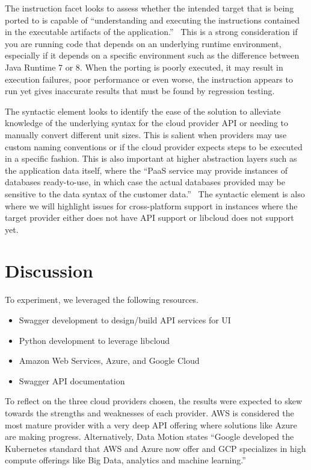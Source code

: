 The instruction facet looks to assess whether the intended target that is being ported to 
is capable of ``understanding and executing the instructions contained in the executable 
artifacts of the application.''~\cite{hid-sp18-518-Cloud-Council} This is a strong 
consideration if you are running code that depends on an underlying runtime environment, 
especially if it depends on a specific environment such as the difference between Java 
Runtime 7 or 8. When the porting is poorly executed, it may result in execution failures, 
poor performance or even worse, the instruction appears to run yet gives inaccurate 
results that must be found by regression testing.

The syntactic element looks to identify the ease of the solution to alleviate knowledge 
of the underlying syntax for the cloud provider API or needing to manually convert 
different unit sizes. This is salient when providers may use custom naming conventions or 
if the cloud provider expects steps to be executed in a specific fashion. This is also 
important at higher abstraction layers such as the application data itself, where the 
``PaaS service may provide instances of databases ready-to-use, in which
case the actual databases provided may be sensitive to the data syntax of the 
customer data.''~\cite{hid-sp18-518-Cloud-Council} The syntactic element is also where
we will highlight issues for cross-platform support in instances where the target 
provider either does not have API support or libcloud does not support yet.

\section{Discussion}

To experiment, we leveraged the following resources.

\begin{itemize}
    \item
    Swagger development to design/build API services for UI
  \item
    Python development to leverage libcloud
  \item
    Amazon Web Services, Azure, and Google Cloud
  \item
    Swagger API documentation
  \end{itemize}

To reflect on the three cloud providers chosen, the results were expected to skew towards
the strengths and weaknesses of each provider. AWS is considered the most mature provider 
with a very deep API offering where solutions like Azure are making progress. 
Alternatively, Data Motion states ``Google developed the Kubernetes standard that AWS and 
Azure now offer and GCP specializes in high compute offerings like Big Data, analytics and 
machine learning.''\cite{hid-sp18-518-DataMotion}

